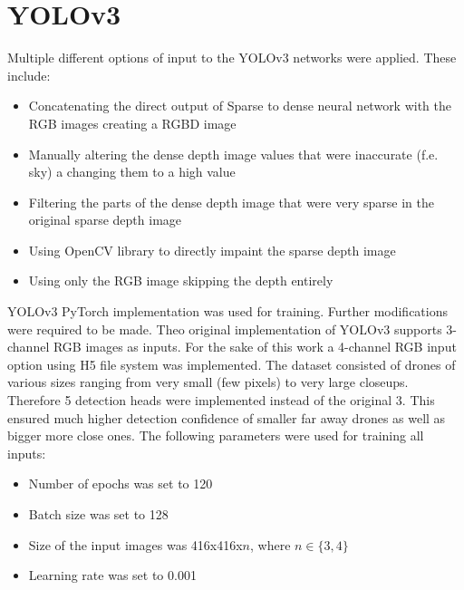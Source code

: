 \documentclass[twoside]{ctuthesis}
\theoremstyle{plain}
\theoremstyle{definition}
\theoremstyle{note}
\begin{document}
\section{YOLOv3}
Multiple different options of input to the YOLOv3 networks were applied. These include:
\begin{itemize}
	\item Concatenating the direct output of Sparse to dense neural network with the RGB images creating a RGBD image
	\item Manually altering the dense depth image values that were inaccurate (f.e. sky) a changing them to a high value
	\item Filtering the parts of the dense depth image that were very sparse in the original sparse depth image
	\item Using OpenCV library to directly impaint the sparse depth image
	\item Using only the RGB image skipping the depth entirely
\end{itemize}
YOLOv3 PyTorch implementation was used for training. Further modifications were required to be made. Theo original implementation of YOLOv3 supports 3-channel RGB images as inputs. For the sake of this work a 4-channel RGB input option using H5 file system was implemented. The dataset consisted of drones of various sizes ranging from very small (few pixels) to very large closeups. Therefore 5 detection heads were implemented instead of the original 3. This ensured much higher detection confidence of smaller far away drones as well as bigger more close ones. The following parameters were used for training all inputs:
\begin{itemize}
	\item Number of epochs was set to 120
	\item Batch size was set to 128
	\item Size of the input images was 416x416x$n$, where $n\in\{3,4\}$
	\item Learning rate was set to 0.001
\end{itemize}
\end{document}
